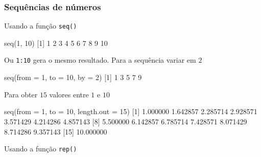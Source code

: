 \documentclass[
  10pt,
  a4paper]{book}
\newenvironment{Shaded}{\begin{snugshade}}{\end{snugshade}}
\newcommand{\AttributeTok}[1]{\textcolor[rgb]{0.77,0.63,0.00}{#1}}
\newcommand{\DecValTok}[1]{\textcolor[rgb]{0.00,0.00,0.81}{#1}}
\newcommand{\FloatTok}[1]{\textcolor[rgb]{0.00,0.00,0.81}{#1}}
\newcommand{\FunctionTok}[1]{\textcolor[rgb]{0.00,0.00,0.00}{#1}}
\newcommand{\NormalTok}[1]{#1}
\begin{document}
\hypertarget{sequuxeancias-de-nuxfameros}{%
\subsubsection{Sequências de números}\label{sequuxeancias-de-nuxfameros}}

Usando a função \texttt{seq()}

\begin{Shaded}
\begin{Highlighting}[]
\FunctionTok{seq}\NormalTok{(}\DecValTok{1}\NormalTok{, }\DecValTok{10}\NormalTok{)}
\NormalTok{ [}\DecValTok{1}\NormalTok{]  }\DecValTok{1}  \DecValTok{2}  \DecValTok{3}  \DecValTok{4}  \DecValTok{5}  \DecValTok{6}  \DecValTok{7}  \DecValTok{8}  \DecValTok{9} \DecValTok{10}
\end{Highlighting}
\end{Shaded}

Ou \texttt{1:10} gera o mesmo resultado. Para a sequência variar em \(2\)

\begin{Shaded}
\begin{Highlighting}[]
\FunctionTok{seq}\NormalTok{(}\AttributeTok{from =} \DecValTok{1}\NormalTok{, }\AttributeTok{to =} \DecValTok{10}\NormalTok{, }\AttributeTok{by =} \DecValTok{2}\NormalTok{)}
\NormalTok{[}\DecValTok{1}\NormalTok{] }\DecValTok{1} \DecValTok{3} \DecValTok{5} \DecValTok{7} \DecValTok{9}
\end{Highlighting}
\end{Shaded}

Para obter \(15\) valores entre \(1\) e \(10\)

\begin{Shaded}
\begin{Highlighting}[]
\FunctionTok{seq}\NormalTok{(}\AttributeTok{from =} \DecValTok{1}\NormalTok{, }\AttributeTok{to =} \DecValTok{10}\NormalTok{, }\AttributeTok{length.out =} \DecValTok{15}\NormalTok{)}
\NormalTok{ [}\DecValTok{1}\NormalTok{]  }\FloatTok{1.000000}  \FloatTok{1.642857}  \FloatTok{2.285714}  \FloatTok{2.928571}  \FloatTok{3.571429}  \FloatTok{4.214286}  \FloatTok{4.857143}
\NormalTok{ [}\DecValTok{8}\NormalTok{]  }\FloatTok{5.500000}  \FloatTok{6.142857}  \FloatTok{6.785714}  \FloatTok{7.428571}  \FloatTok{8.071429}  \FloatTok{8.714286}  \FloatTok{9.357143}
\NormalTok{[}\DecValTok{15}\NormalTok{] }\FloatTok{10.000000}
\end{Highlighting}
\end{Shaded}

Usando a função \texttt{rep()}
\end{document}
